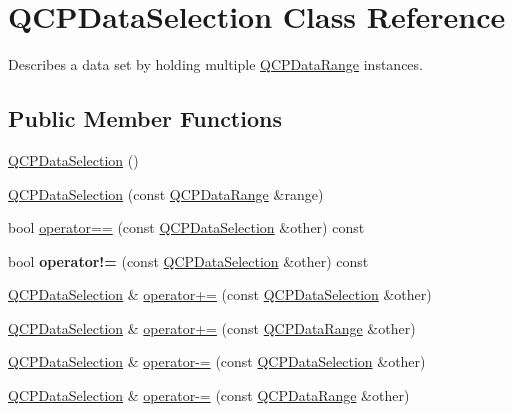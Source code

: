 \hypertarget{classQCPDataSelection}{}\section{Q\+C\+P\+Data\+Selection Class Reference}
\label{classQCPDataSelection}


Describes a data set by holding multiple \hyperlink{classQCPDataRange}{Q\+C\+P\+Data\+Range} instances.  


\subsection*{Public Member Functions}
\begin{DoxyCompactItemize}
\item 
\hyperlink{classQCPDataSelection_a0e0b7faaec7df1a7c77dd6f4883cdf0d}{Q\+C\+P\+Data\+Selection} ()
\item 
\hyperlink{classQCPDataSelection_a738dfb4f5718c5df5ed35ea33ac37818}{Q\+C\+P\+Data\+Selection} (const \hyperlink{classQCPDataRange}{Q\+C\+P\+Data\+Range} \&range)
\item 
bool \hyperlink{classQCPDataSelection_a664fa566569b17148abafd6b1dbbf347}{operator==} (const \hyperlink{classQCPDataSelection}{Q\+C\+P\+Data\+Selection} \&other) const
\item 
\mbox{\label{classQCPDataSelection_a8324733cc88660ee4792ee60d6a4520c}} 
bool {\bfseries operator!=} (const \hyperlink{classQCPDataSelection}{Q\+C\+P\+Data\+Selection} \&other) const
\item 
\hyperlink{classQCPDataSelection}{Q\+C\+P\+Data\+Selection} \& \hyperlink{classQCPDataSelection_a4584d4b0ea5c4f095bd7b70f88eb5d9d}{operator+=} (const \hyperlink{classQCPDataSelection}{Q\+C\+P\+Data\+Selection} \&other)
\item 
\hyperlink{classQCPDataSelection}{Q\+C\+P\+Data\+Selection} \& \hyperlink{classQCPDataSelection_a17058640d4e6f49984a0e7e42043df1b}{operator+=} (const \hyperlink{classQCPDataRange}{Q\+C\+P\+Data\+Range} \&other)
\item 
\hyperlink{classQCPDataSelection}{Q\+C\+P\+Data\+Selection} \& \hyperlink{classQCPDataSelection_a66f9fab70b026baa64bf8e52fe5de07e}{operator-\/=} (const \hyperlink{classQCPDataSelection}{Q\+C\+P\+Data\+Selection} \&other)
\item 
\hyperlink{classQCPDataSelection}{Q\+C\+P\+Data\+Selection} \& \hyperlink{classQCPDataSelection_a8d18b20d20dde737eefc10967e31cf73}{operator-\/=} (const \hyperlink{classQCPDataRange}{Q\+C\+P\+Data\+Range} \&other)

\end{DoxyCompactItemize}
